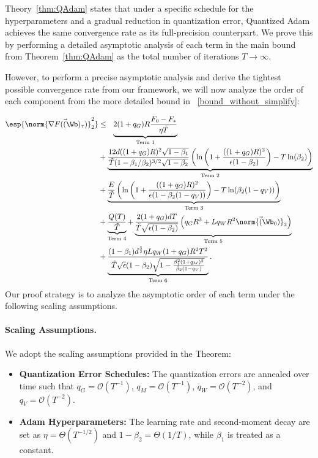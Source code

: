\documentclass[11pt, letterpaper]{article}
\begin{document}
Theory~\ref{thm:QAdam}  states that under a specific schedule for the hyperparameters and a gradual reduction in quantization error, Quantized Adam achieves the same convergence rate as its full-precision counterpart. We prove this by performing a detailed asymptotic analysis of each term in the main bound from Theorem~\ref{thm:QAdam} as the total number of iterations $T \to \infty$.

However, to perform a precise asymptotic analysis and derive the tightest possible convergence rate from our framework, we will now analyze the order of each component from the more detailed bound in ~\ref{bound_without_simplify}:

\begin{align*}
\esp{\norm{\nabla F(\vec(\Wb)_{\tau})}_2^2} &\leq
    \underbrace{2 (1+q_G)R \frac{F_0 - F_*}{\eta \tilde{T}}}_{\text{Term 1}} \\
    &+ \underbrace{\frac{12 d ((1+q_G)R)^2 \sqrt{1-\beta_1}}{\tilde{T}(1 - \beta_1 / \beta_2)^{3/2}\sqrt{1 - \beta_2}} \left(\ln\left(1 + \frac{((1+q_G)R)^2}{\epsilon ( 1- \beta_2)}\right) - T \ln(\beta_2)\right)}_{\text{Term 2}}\\
    &+ \underbrace{\frac{E}{\tilde{T}}\left(\ln\left(1 + \frac{((1+q_G)R)^2}{\epsilon(1-\beta_2(1-q_V))}\right) - T\ln(\beta_2(1-q_V))\right)}_{\text{Term 3}} \\
    &+ \underbrace{\frac{Q(T)}{\tilde{T}}}_{\text{Term 4}} + \underbrace{\frac{2(1+q_G) d T}{\tilde{T}\sqrt{\epsilon(1-\beta_2)}} \left( q_G R^3 + L q_W R^2 \norm{\vec(\Wb_0)}_2 \right)}_{\text{Term 5}} \\
    &+ \underbrace{\frac{(1-\beta_1)d^\frac{3}{2} \eta L q_W(1+q_G)R^2 T^2}{\tilde{T}\sqrt{\epsilon}(1-\beta_2)\sqrt{1-\frac{\beta_1^2(1+q_M)^2}{\beta_2(1-q_V)}}}}_{\text{Term 6}}.
\end{align*}
Our proof strategy is to analyze the asymptotic order of each term under the following scaling assumptions.



\paragraph{Scaling Assumptions.}
We adopt the scaling assumptions provided in the Theorem:
\begin{itemize}[leftmargin=*]
    \item \textbf{Quantization Error Schedules:} The quantization errors are annealed over time such that $q_G = \mathcal{O}(T^{-1})$, $q_M = \mathcal{O}(T^{-1})$, $q_W = \mathcal{O}(T^{-2})$, and $q_V = \mathcal{O}(T^{-2})$.
    \item \textbf{Adam Hyperparameters:} The learning rate and second-moment decay are set as $\eta = \Theta(T^{-1/2})$ and $1-\beta_2 = \Theta(1/T)$, while $\beta_1$ is treated as a constant.
\end{itemize}
\end{document}
